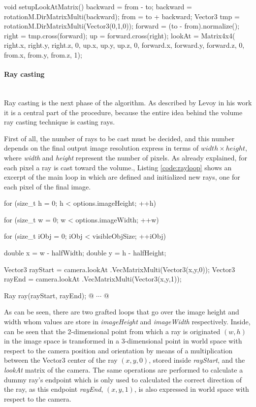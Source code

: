 \documentclass[12pt,a4paper]{extarticle}
\newcommand{\linespace}{\vspace{0pt}}
\newcommand{\myparagraph}[1]{\paragraph{#1}\mbox{}\\}
\begin{document}
\begin{cpp}[caption={Camera class member function that build the lookAt transformation matrix, applying the final \textit{rotationM} matrix which group all the rotational transformation matrices. },label=code:cameralookat]
void setupLookAtMatrix() {
	backward = from - to;
	backward = rotationM.DirMatrixMulti(backward);
	from = to + backward;
	Vector3 tmp = rotationM.DirMatrixMulti(Vector3(0,1,0));
	forward = (to - from).normalize();
	right = tmp.cross(forward);
	up = forward.cross(right);
	lookAt = Matrix4x4(
		right.x, right.y, right.z, 0,
		up.x, up.y, up.z, 0,
		forward.x, forward.y, forward.z, 0,
		from.x, from.y, from.z, 1);
}
\end{cpp}

\myparagraph{Ray casting} Ray casting is the next phase of the algorithm. As described by Levoy in his work \cite{levoy_1990:5} it is a central part of the procedure, because the entire idea behind the volume ray casting technique is casting rays.

First of all, the number of rays to be cast must be decided, and this number depends on the final output image resolution express in terms of $width \times height$, where \textit{width} and \textit{height} represent the number of pixels.
As already explained, for each pixel a ray is cast toward the volume., Listing \ref{code:rayloop} shows an excerpt of the main loop in which are defined and initialized new rays, one for each pixel of the final image.


\begin{cpp}[caption={Main loop in which a ray is created for each output image pixel, and which origin point is transformed from screen space $(w,h)$ to world space coordinates $(x_{1},y_{1},z_{1})$.},label=code:rayloop]
for (size_t h = 0; h < options.imageHeight; ++h) {
	for (size_t w = 0; w < options.imageWidth; ++w) {
		for (size_t iObj = 0; iObj < visibleObjSize; ++iObj) {
			double x = w - halfWidth;
			double y = h - halfHeight;

			Vector3 rayStart = camera.lookAt
									.VecMatrixMulti(Vector3(x,y,0));
			Vector3 rayEnd = camera.lookAt
									.VecMatrixMulti(Vector3(x,y,1));

			Ray ray(rayStart, rayEnd);
			@ $\cdots$ @
		}
	}
}
			
\end{cpp}

As can be seen, there are two grafted loops that go over the image height and width whom values are store in \textit{imageHeight} and \textit{imageWidth} respectively. Inside, can be seen that the 2-dimensional point from which a ray is originated $(w,h)$ in the image space is transformed in a 3-dimensional point in world space with respect to the camera position and orientation by means of a multiplication between the Vector3 center of the ray $(x,y,0)$, stored inside \textit{rayStart}, and the \textit{lookAt } matrix of the camera. The same operations are performed to calculate a dummy ray's endpoint which is only used to calculated the correct direction of the ray, as this endpoint \textit{rayEnd}, $(x,y,1)$, is also expressed in world space with respect to the camera.
\linespace
\end{document}

